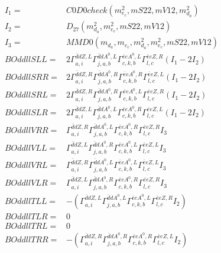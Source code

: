 \documentclass[A4,landscape]{article}
\begin{document}
\begin{align} 
I_1 = & C0D0check(m^2_{e_{{c}}}, mS22, mV12, m^2_{d_{{a}}}) \\ 
I_2 = & D_{27}(m^2_{d_{{a}}}, m^2_{e_{{c}}}, mS22, mV12) \\ 
I_3 = & MMD0(m_{d_{{a}}}, m_{e_{{c}}}, m^2_{d_{{a}}}, m^2_{e_{{c}}}, mS22, mV12) \\ 
  BOddllSLL= & 2  \Gamma^{\bar{d}d Z ,L}_{a, i} \Gamma^{\bar{d}d A^0 ,L}_{j, a, b} \Gamma^{\bar{e}e A^0 ,L}_{c, k, b} \Gamma^{\bar{e}e Z ,R}_{l, c} (I_1 - 2 I_2) \\ 
  BOddllSRR= & 2  \Gamma^{\bar{d}d Z ,R}_{a, i} \Gamma^{\bar{d}d A^0 ,R}_{j, a, b} \Gamma^{\bar{e}e A^0 ,R}_{c, k, b} \Gamma^{\bar{e}e Z ,L}_{l, c} (I_1 - 2 I_2) \\ 
  BOddllSRL= & 2  \Gamma^{\bar{d}d Z ,R}_{a, i} \Gamma^{\bar{d}d A^0 ,R}_{j, a, b} \Gamma^{\bar{e}e A^0 ,L}_{c, k, b} \Gamma^{\bar{e}e Z ,R}_{l, c} (I_1 - 2 I_2) \\ 
  BOddllSLR= & 2  \Gamma^{\bar{d}d Z ,L}_{a, i} \Gamma^{\bar{d}d A^0 ,L}_{j, a, b} \Gamma^{\bar{e}e A^0 ,R}_{c, k, b} \Gamma^{\bar{e}e Z ,L}_{l, c} (I_1 - 2 I_2) \\ 
  BOddllVRR= &  \Gamma^{\bar{d}d Z ,R}_{a, i} \Gamma^{\bar{d}d A^0 ,L}_{j, a, b} \Gamma^{\bar{e}e A^0 ,R}_{c, k, b} \Gamma^{\bar{e}e Z ,R}_{l, c} I_3 \\ 
  BOddllVLL= &  \Gamma^{\bar{d}d Z ,L}_{a, i} \Gamma^{\bar{d}d A^0 ,R}_{j, a, b} \Gamma^{\bar{e}e A^0 ,L}_{c, k, b} \Gamma^{\bar{e}e Z ,L}_{l, c} I_3 \\ 
  BOddllVRL= &  \Gamma^{\bar{d}d Z ,R}_{a, i} \Gamma^{\bar{d}d A^0 ,L}_{j, a, b} \Gamma^{\bar{e}e A^0 ,L}_{c, k, b} \Gamma^{\bar{e}e Z ,L}_{l, c} I_3 \\ 
  BOddllVLR= &  \Gamma^{\bar{d}d Z ,L}_{a, i} \Gamma^{\bar{d}d A^0 ,R}_{j, a, b} \Gamma^{\bar{e}e A^0 ,R}_{c, k, b} \Gamma^{\bar{e}e Z ,R}_{l, c} I_3 \\ 
  BOddllTLL= & -( \Gamma^{\bar{d}d Z ,L}_{a, i} \Gamma^{\bar{d}d A^0 ,L}_{j, a, b} \Gamma^{\bar{e}e A^0 ,L}_{c, k, b} \Gamma^{\bar{e}e Z ,R}_{l, c} I_2) \\ 
  BOddllTLR= & 0 \\ 
  BOddllTRL= & 0 \\ 
  BOddllTRR= & -( \Gamma^{\bar{d}d Z ,R}_{a, i} \Gamma^{\bar{d}d A^0 ,R}_{j, a, b} \Gamma^{\bar{e}e A^0 ,R}_{c, k, b} \Gamma^{\bar{e}e Z ,L}_{l, c} I_2) \\ 
\end{align} 
\end{document}
